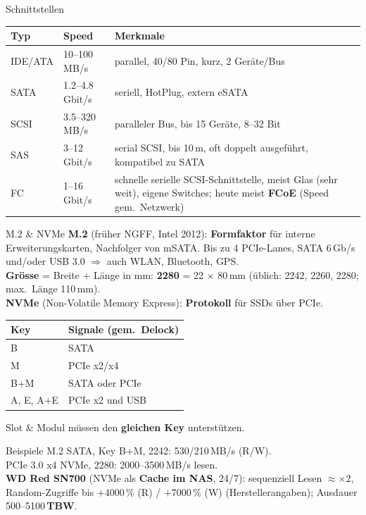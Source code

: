 \documentclass[a4paper, fontsize=7pt]{scrartcl}
\renewcommand*{\arraystretch}{1.5}  %
\begin{document}
\begin{mainbox}{Schnittstellen}
\renewcommand*{\arraystretch}{1.15}
\setlength{\tabcolsep}{3pt}
\begin{tabularx}{\linewidth}{@{}l|l|>{\raggedright\arraybackslash}X@{}}
\textbf{Typ} & \textbf{Speed} & \textbf{Merkmale} \\
\hline
IDE/ATA & 10--100\,MB/s & parallel, 40/80 Pin, kurz, 2 Geräte/Bus \\
SATA & 1.2--4.8\,Gbit/s & seriell, HotPlug, extern eSATA \\
SCSI & 3.5--320\,MB/s & paralleler Bus, bis 15 Geräte, 8--32 Bit \\
SAS & 3--12\,Gbit/s & serial SCSI, bis 10\,m, oft doppelt ausgeführt, kompatibel
  zu SATA \\
FC & 1--16\,Gbit/s & schnelle serielle SCSI-Schnittstelle, meist Glas (sehr
  weit), eigene Switches; heute meist \textbf{FCoE} (Speed gem.\ Netzwerk) \\
\end{tabularx}
\end{mainbox}

\begin{mainbox}{M.2 \& NVMe}
\textbf{M.2} (früher NGFF, Intel 2012): \textbf{Formfaktor} für interne
Erweiterungskarten, Nachfolger von mSATA. Bis zu 4 PCIe-Lanes, SATA 6\,Gb/s
und/oder USB 3.0 $\Rightarrow$ auch WLAN, Bluetooth, GPS.\\
\textbf{Grösse} = Breite + Länge in mm: \textbf{2280} = 22 $\times$ 80\,mm
(üblich: 2242, 2260, 2280; max.\ Länge 110\,mm).\\
\textbf{NVMe} (Non-Volatile Memory Express): \textbf{Protokoll} für SSDs über
PCIe.
\renewcommand*{\arraystretch}{1.15}
\begin{center}
\setlength{\tabcolsep}{3pt}
\begin{tabular}{l|l}
\textbf{Key} & \textbf{Signale} (gem.\ Delock) \\
\hline
B & SATA \\
M & PCIe x2/x4 \\
B+M & SATA oder PCIe \\
A, E, A+E & PCIe x2 und USB \\
\end{tabular}
\end{center}
Slot \& Modul müssen den \textbf{gleichen Key} unterstützen.
\end{mainbox}

\begin{subbox}{Beispiele M.2}
SATA, Key B+M, 2242: 530/210\,MB/s (R/W).\\
PCIe 3.0 x4 NVMe, 2280: 2000--3500\,MB/s lesen.\\
\textbf{WD Red SN700} (NVMe als \textbf{Cache im NAS}, 24/7): sequenziell
Lesen $\approx \times 2$, Random-Zugriffe bis $+$4000\,\% (R) / $+$7000\,\% (W)
(Herstellerangaben); Ausdauer 500--5100\,\textbf{TBW}.
\end{subbox}
\end{document}
